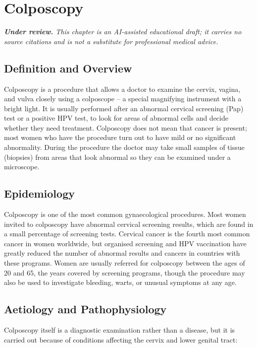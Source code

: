 \chapter{Colposcopy}

\medskip
\noindent\textit{\textbf{Under review.} This chapter is an AI-assisted educational draft; it carries no source citations and is not a substitute for professional medical advice.}

\section*{Definition and Overview}
Colposcopy is a procedure that allows a doctor to examine the cervix, vagina, and vulva closely using a colposcope -- a special magnifying instrument with a bright light. It is usually performed after an abnormal cervical screening (Pap) test or a positive HPV test, to look for areas of abnormal cells and decide whether they need treatment. Colposcopy does not mean that cancer is present; most women who have the procedure turn out to have mild or no significant abnormality. During the procedure the doctor may take small samples of tissue (biopsies) from areas that look abnormal so they can be examined under a microscope.

\section*{Epidemiology}
Colposcopy is one of the most common gynaecological procedures. Most women invited to colposcopy have abnormal cervical screening results, which are found in a small percentage of screening tests. Cervical cancer is the fourth most common cancer in women worldwide, but organised screening and HPV vaccination have greatly reduced the number of abnormal results and cancers in countries with these programs. Women are usually referred for colposcopy between the ages of 20 and 65, the years covered by screening programs, though the procedure may also be used to investigate bleeding, warts, or unusual symptoms at any age.

\section*{Aetiology and Pathophysiology}
Colposcopy itself is a diagnostic examination rather than a disease, but it is carried out because of conditions affecting the cervix and lower genital tract:

